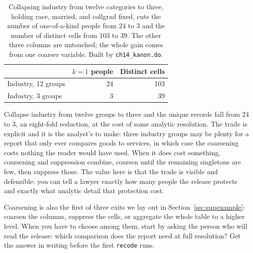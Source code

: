 \documentclass[
    a4paper,
    fontsize=10pt,
    twoside=true,
    numbers=noenddot,
]{kaobook}
\begin{document}
\begin{table}[htbp]
\centering
{\footnotesize
\begin{tabular}{lrr}
\hline
                       & $k=1$ people & Distinct cells \\
\hline
Industry, 12 groups    & 24 & 103 \\
Industry, 3 groups     &  3 &  39 \\
\hline
\end{tabular}
}
\caption[Coarsening industry collapses unique records]{Collapsing industry from twelve categories to three, holding race, married, and collgrad fixed, cuts the number of one-of-a-kind people from 24 to 3 and the number of distinct cells from 103 to 39. The other three columns are untouched; the whole gain comes from one coarser variable. Built by \texttt{ch14\_kanon.do}.}
\label{tab:coarsen}
\end{table}

Collapse industry from twelve groups to three and the unique records fall from 24 to 3, an eight-fold reduction, at the cost of some analytic resolution.  The trade is explicit and it is the analyst's to make: three industry groups may be plenty for a report that only ever compares goods to services, in which case the coarsening costs nothing the reader would have used. When it does cost something, coarsening and suppression combine, coarsen until the remaining singletons are few, then suppress those. The value here is that the trade is visible and defensible: you can tell a lawyer exactly how many people the release protects and exactly what analytic detail that protection cost.

Coarsening is also the first of three exits we lay out in Section~\ref{sec:supexample}: coarsen the columns, suppress the cells, or aggregate the whole table to a higher level. When you have to choose among them, start by asking the person who will read the release: which comparison does the report need at full resolution? Get the answer in writing before the first \texttt{recode} runs.
\end{document}

